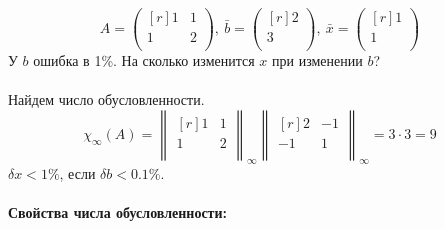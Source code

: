 \documentclass[12pt]{article}
\theoremstyle{definition}
\numberwithin{equation}{section}
\begin{document}
	\[A=\begin{pmatrix}[r]
	1 & 1 \\
	1 & 2 \\
	\end{pmatrix},~ \bar b=\begin{pmatrix}[r]
	2 \\
	3 \\
	\end{pmatrix}, ~\bar x=\begin{pmatrix}[r]
	1 \\
	1 \\
	\end{pmatrix}\]
	У $b$ ошибка в 1\%. На сколько изменится $x$ при изменении $b$?\\ \\
	Найдем число обусловленности.
	\[\chi_{\infty}(A) = \begin{Vmatrix}[r]
	1 & 1 \\
	1 & 2 \\
	\end{Vmatrix}_{\infty} \begin{Vmatrix}[r]
	2 & -1 \\
	-1 & 1 \\
	\end{Vmatrix}_{\infty} = 3\cdot 3 = 9\]
	$\delta x < 1\%$, если $\delta b < 0.1 \%$.\\
	\\
	\textbf{Свойства числа обусловленности:}
\end{document}
